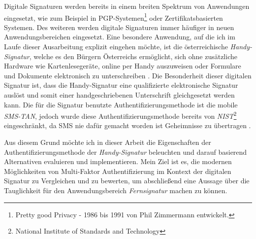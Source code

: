 \documentclass[11pt,a4paper,ngerman]{report}
\begin{document}
Digitale Signaturen werden bereits in einem breiten Spektrum von Anwendungen eingesetzt, wie zum Beispiel in PGP-Systemen\footnote{Pretty good Privacy - 1986 bis 1991 von Phil Zimmermann entwickelt.} oder Zertifikatsbasierten Systemen. Des weiteren werden digitale Signaturen immer häufiger in neuen Anwendungsbereichen eingesetzt. Eine besondere Anwendung, auf die ich im Laufe dieser Ausarbeitung explizit eingehen möchte, ist die österreichische \textit{Handy-Signatur}, welche es den Bürgern Österreichs ermöglicht, sich ohne zusätzliche Hardware wie Kartenlesegeräte, online per Handy auszuweisen oder Formulare und Dokumente elektronisch zu unterschreiben \cite{handySigOnline}. Die Besonderheit dieser digitalen Signatur ist, dass die Handy-Signatur eine qualifizierte elektronische Signatur auslöst und somit einer handgeschriebenen Unterschrift gleichgesetzt werden kann. Die für die Signatur benutzte Authentifizierungsmethode ist die mobile \textit{SMS-TAN}, jedoch wurde diese Authentifizierungsmethode bereits von \textit{NIST}\footnote{National Institute of Standards and Technology} eingeschränkt, da SMS nie dafür gemacht worden ist Geheimnisse zu übertragen \cite{mobileSec,NIST800-63B}.

Aus diesem Grund möchte ich in dieser Arbeit die Eigenschaften der Authentifizierungsmethode der \textit{Handy-Signatur} beleuchten und darauf basierend Alternativen evaluieren und implementieren. Mein Ziel ist es, die modernen Möglichkeiten von Multi-Faktor Authentifizierung im Kontext der digitalen Signatur zu Vergleichen und zu bewerten, um abschließend eine Aussage über die Tauglichkeit für den Anwendungsbereich \textit{Fernsignatur} machen zu können.


\end{document}
